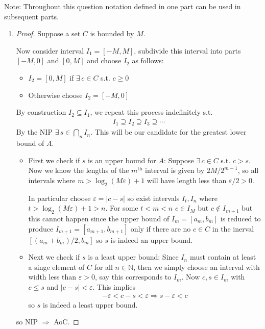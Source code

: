  Note: Throughout this question notation defined in one part can be used in 
 subsequent parts.
 \begin{enumerate}[label=(\alph*)]
    \item 
    \begin{proof}
        Suppose a set $C$ is bounded by $M$. 
    
        Now consider interval $I_1 = [-M, M]$, subdivide this interval into 
        parts $[-M,0]$ and $[0, M]$ and choose $I_2$ as follows:
        \begin{itemize}
            \item $I_2 = [0,M]$ if $\exists \, c\in C$ s.t. $c \geq 0$
            \item Otherwise choose $I_2 = [-M,0]$
        \end{itemize}
        By construction $I_2 \subseteq I_1$, we repeat this process 
        indefinitely s.t. 
        \begin{align*}
            I_1 \supseteq I_2 \supseteq I_3 \supseteq \cdots
        \end{align*}
        By the NIP $\exists \, s \in \bigcap_n I_n$. This will be our 
        candidate for the greatest lower bound of $A$.

        \begin{itemize}
            \item First we check if $s$ is an upper bound for $A$:
                Suppose $\exists \, c \in C$ s.t. $c > s$. Now we know the 
                lengths of the $m^{\text{th}}$ interval is given by $2M / 2^{m-1}$,
                so all intervals where $m > \log_2(M \varepsilon)+1$ will have length 
                less than $\varepsilon/2 > 0$.

                In particular choose $\varepsilon = |c-s|$ so exist intervals $I_t, I_n$ where $t > \log_2(M \varepsilon)+1 > n$.
                For some $t < m < n$ $c \in I_M$ but $c \not\in I_{m+1}$
                but this cannot happen since the upper bound of $I_{m} = [a_{m},b_m]$ is reduced
                to produce $I_{m+1}=[a_{m+1}, b_{m+1}]$ 
                only if there are no $c\in C$ in the inerval $[(a_{m}+b_m)/2, b_m]$ so $s$ is indeed
                an upper bound.

                \item Next we check if $s$ is a least upper bound: 
                Since $I_n$ must contain at least a singe element of $C$ for all $n \in \mathbb{N}$, then
                we simply choose an interval with width less than $\varepsilon > 0$, say this corresponds to
                $I_m$. Now $c, s \in I_m$ with $c \leq s$ and $|c-s| < \varepsilon$.
                This implies
                \begin{align*}
                    -\varepsilon < c - s < \varepsilon \Rightarrow s - \varepsilon < c
                \end{align*} 
                so $s$ is indeed a least upper bound.
            \end{itemize}
            so NIP $ \Rightarrow $ AoC.
    \end{proof}


\end{enumerate}
